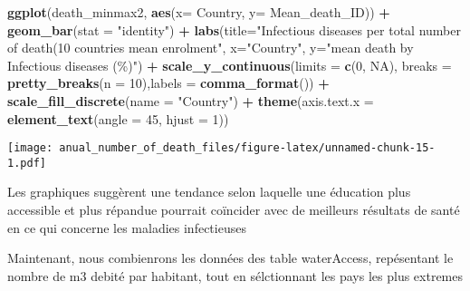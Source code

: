 \documentclass[
]{article}
\newenvironment{Shaded}{\begin{snugshade}}{\end{snugshade}}
\newcommand{\AttributeTok}[1]{\textcolor[rgb]{0.13,0.29,0.53}{#1}}
\newcommand{\ConstantTok}[1]{\textcolor[rgb]{0.56,0.35,0.01}{#1}}
\newcommand{\DecValTok}[1]{\textcolor[rgb]{0.00,0.00,0.81}{#1}}
\newcommand{\FunctionTok}[1]{\textcolor[rgb]{0.13,0.29,0.53}{\textbf{#1}}}
\newcommand{\NormalTok}[1]{#1}
\newcommand{\SpecialCharTok}[1]{\textcolor[rgb]{0.81,0.36,0.00}{\textbf{#1}}}
\newcommand{\StringTok}[1]{\textcolor[rgb]{0.31,0.60,0.02}{#1}}
\begin{document}
\begin{Shaded}
\begin{Highlighting}[]
\FunctionTok{ggplot}\NormalTok{(death\_minmax2, }\FunctionTok{aes}\NormalTok{(}\AttributeTok{x=}\NormalTok{ Country, }\AttributeTok{y=} \StringTok{\textasciigrave{}}\AttributeTok{Mean\_death\_ID}\StringTok{\textasciigrave{}}\NormalTok{)) }\SpecialCharTok{+} \FunctionTok{geom\_bar}\NormalTok{(}\AttributeTok{stat =} \StringTok{"identity"}\NormalTok{) }\SpecialCharTok{+} \FunctionTok{labs}\NormalTok{(}\AttributeTok{title=}\StringTok{"Infectious diseases per total number of death(10 countries mean enrolment"}\NormalTok{, }\AttributeTok{x=}\StringTok{"Country"}\NormalTok{, }\AttributeTok{y=}\StringTok{"mean death by Infectious diseases (\%)"}\NormalTok{) }\SpecialCharTok{+}  \FunctionTok{scale\_y\_continuous}\NormalTok{(}\AttributeTok{limits =} \FunctionTok{c}\NormalTok{(}\DecValTok{0}\NormalTok{, }\ConstantTok{NA}\NormalTok{), }\AttributeTok{breaks =} \FunctionTok{pretty\_breaks}\NormalTok{(}\AttributeTok{n =} \DecValTok{10}\NormalTok{),}\AttributeTok{labels =} \FunctionTok{comma\_format}\NormalTok{()) }\SpecialCharTok{+} \FunctionTok{scale\_fill\_discrete}\NormalTok{(}\AttributeTok{name =} \StringTok{"Country"}\NormalTok{) }\SpecialCharTok{+} 
  \FunctionTok{theme}\NormalTok{(}\AttributeTok{axis.text.x =} \FunctionTok{element\_text}\NormalTok{(}\AttributeTok{angle =} \DecValTok{45}\NormalTok{, }\AttributeTok{hjust =} \DecValTok{1}\NormalTok{)) }
\end{Highlighting}
\end{Shaded}

\texttt{[image: anual\_number\_of\_death\_files/figure-latex/unnamed-chunk-15-1.pdf]}

Les graphiques suggèrent une tendance selon laquelle une éducation plus
accessible et plus répandue pourrait coïncider avec de meilleurs
résultats de santé en ce qui concerne les maladies infectieuses

Maintenant, nous combienrons les données des table waterAccess,
repésentant le nombre de m3 debité par habitant, tout en sélctionnant
les pays les plus extremes
\end{document}
